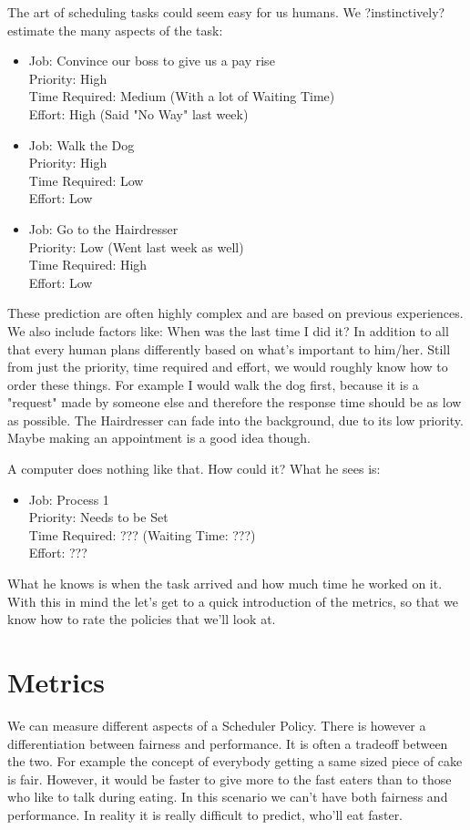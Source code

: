 \documentclass{report}
\begin{document}
The art of scheduling tasks could seem easy for us humans.
We ?instinctively? estimate the many aspects of the task:
\begin{itemize}
\item Job: Convince our boss to give us a pay rise\\Priority: High\\Time Required: Medium (With a lot of Waiting Time)\\Effort: High (Said "No Way" last week)
\item Job: Walk the Dog\\Priority: High\\Time Required: Low\\Effort: Low
\item Job: Go to the Hairdresser\\ Priority: Low (Went last week as well)\\Time Required: High\\Effort: Low
\end{itemize}
These prediction are often highly complex and are based on previous experiences.
We also include factors like: When was the last time I did it?
In addition to all that every human plans differently based on what's important to him/her.
Still from just the priority, time required and effort, we would roughly know how to order these things.
For example I would walk the dog first, because it is a "request" made by someone else and therefore the response time should be as low as possible.
The Hairdresser can fade into the background, due to its low priority. Maybe making an appointment is a good idea though.

A computer does nothing like that. How could it? What he sees is:
\begin{itemize}
\item Job: Process 1\\Priority: Needs to be Set\\Time Required: ??? (Waiting Time: ???)\\Effort: ???
\end{itemize}
What he knows is when the task arrived and how much time he worked on it.
With this in mind the let's get to a quick introduction of the metrics, so that we know how to rate the policies that we'll look at.



\section{Metrics}
We can measure different aspects of a Scheduler Policy. There is however a differentiation between fairness and performance. It is often a tradeoff between the two. For example the concept of everybody getting a same sized piece of cake is fair. However, it would be faster to give more to the fast eaters than to those who like to talk during eating. In this scenario we can't have both fairness and performance. In reality it is really difficult to predict, who'll eat faster.
\end{document}
